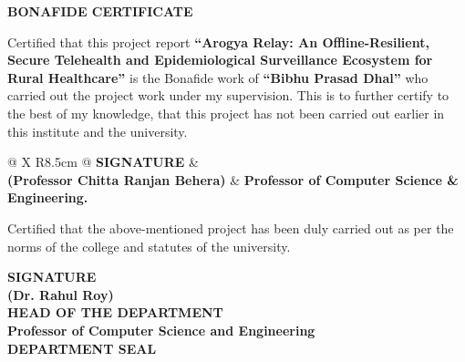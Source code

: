 \documentclass[12pt,a4paper,oneside]{report}
\begin{document}
\setcounter{page}{2}

\clearpage
{}
\thispagestyle{plain}

\begin{center}
    {\fontsize{16}{20}\selectfont \bfseries BONAFIDE CERTIFICATE}
\end{center}
\vspace{0.8cm}

{\fontsize{13}{20}\selectfont
\noindent Certified that this project report \textbf{``Arogya Relay: An Offline-Resilient, Secure Telehealth and Epidemiological Surveillance Ecosystem for Rural Healthcare''} is the Bonafide work of \textbf{``Bibhu Prasad Dhal''} who carried out the project work under my supervision. This is to further certify to the best of my knowledge, that this project has not been carried out earlier in this institute and the university.
}

\vspace{1.8cm}

\noindent
\begin{tabularx}{\textwidth}{@{} X R{8.5cm} @{}}
    \textbf{SIGNATURE} & \\[1.0cm]
    \textbf{(Professor Chitta Ranjan Behera)} & \textbf{Professor of Computer Science \& Engineering.}
\end{tabularx}

\vspace{1.8cm}

{\fontsize{13}{20}\selectfont
\noindent Certified that the above-mentioned project has been duly carried out as per the norms of the college and statutes of the university.
}

\vspace{1.5cm}

\begin{center}
    \textbf{SIGNATURE} \\[1.0cm]
    \textbf{(Dr. Rahul Roy)} \\[0.15cm]
    \textbf{HEAD OF THE DEPARTMENT} \\[0.15cm]
    \textbf{Professor of Computer Science and Engineering} \\[1.0cm]
    \textbf{DEPARTMENT SEAL}
\end{center}
\end{document}
